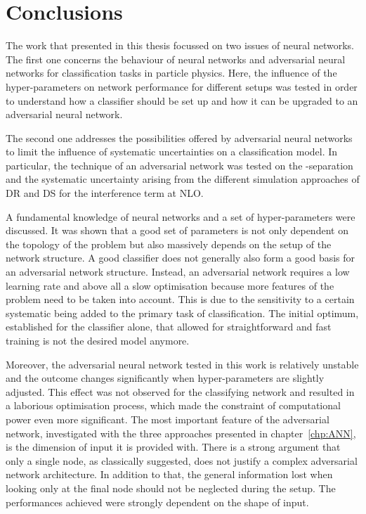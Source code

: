 \chapter{Conclusions}

The work that presented in this thesis focussed on two issues of neural networks. The first one concerns the behaviour of neural networks and adversarial neural networks for classification tasks in particle physics. Here, the influence of the hyper-parameters on network performance for different setups was tested in order to understand how a classifier should be set up and how it can be upgraded to an adversarial neural network.

The second one addresses the possibilities offered by adversarial neural networks to limit the influence of systematic uncertainties on a classification model. In particular, the technique of an adversarial network was tested on the \tW-\ttbar separation and the systematic uncertainty arising from the different simulation approaches of DR and DS for the interference term at NLO.

A fundamental knowledge of neural networks and a set of hyper-parameters were discussed. It was shown that a good set of parameters is not only dependent on the topology of the problem but also massively depends on the setup of the network structure. A good classifier does not generally also form a good basis for an adversarial network structure. Instead, an adversarial network requires a low learning rate and above all a slow optimisation because more features of the problem need to be taken into account. This is due to the sensitivity to a certain systematic being added to the primary task of classification. The initial optimum, established for the classifier alone, that allowed for straightforward and fast training is not the desired model anymore.

Moreover, the adversarial neural network tested in this work is relatively unstable and the outcome changes significantly when hyper-parameters are slightly adjusted. This effect was not observed for the classifying network and resulted in a laborious optimisation process, which made the constraint of computational power even more significant.
The most important feature of the adversarial network, investigated with the three approaches presented in chapter~\ref{chp:ANN}, is the dimension of input it is provided with. There is a strong argument that only a single node, as classically suggested, does not justify a complex adversarial network architecture. In addition to that, the general information lost when looking only at the final node should not be neglected during the setup. The performances achieved were strongly dependent on the shape of input.

